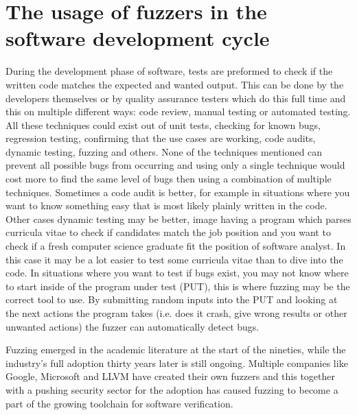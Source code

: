 \section{The usage of fuzzers in the software development cycle}
\label{intro:SoftwareDevelopmentCycle}
During the development phase of software, tests are preformed to check if the written code matches the expected and wanted output. This can be done by the developers themselves or by quality assurance testers which do this full time and this on multiple different ways: code review, manual testing or automated testing. All these techniques could exist out of unit tests, checking for known bugs, regression testing, confirming that the use cases are working, code audits, dynamic testing, fuzzing and others. None of the techniques mentioned can prevent all possible bugs from occurring and using only a single technique would cost more to find the same level of bugs then using a combination of multiple techniques. Sometimes a code audit is better, for example in situations where you want to know something easy that is most likely plainly written in the code. Other cases dynamic testing may be better, image having a program which parses curricula vitae to check if candidates match the job position and you want to check if a fresh computer science graduate fit the position of software analyst. In this case it may be a lot easier to test some curricula vitae than to dive into the code. In situations where you want to test if bugs exist, you may not know where to start inside of the program under test (PUT), this is where fuzzing may be the correct tool to use. By submitting random inputs into the PUT and looking at the next actions the program takes (i.e. does it crash, give wrong results or other unwanted actions) the fuzzer can automatically detect bugs.

Fuzzing emerged in the academic literature at the start of the nineties, while the industry's full adoption thirty years later is still ongoing. Multiple companies like Google, Microsoft and LLVM have created their own fuzzers and this together with a pushing security sector for the adoption has caused fuzzing to become a part of the growing toolchain for software verification.

